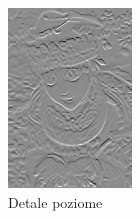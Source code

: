 \begin{figure}[ht]
    \centering

    \begin{minipage}[t]{0.3\linewidth}
        \includegraphics[width=\linewidth]{Rozdziały/02.Podstawy_teoretyczne/horizontal_detail.png}
        \caption{Detale poziome}
        \label{fig:image19}
    \end{minipage}
    \hspace{0.5cm}
    \begin{minipage}[t]{0.3\linewidth}

\end{minipage}
\end{figure}
